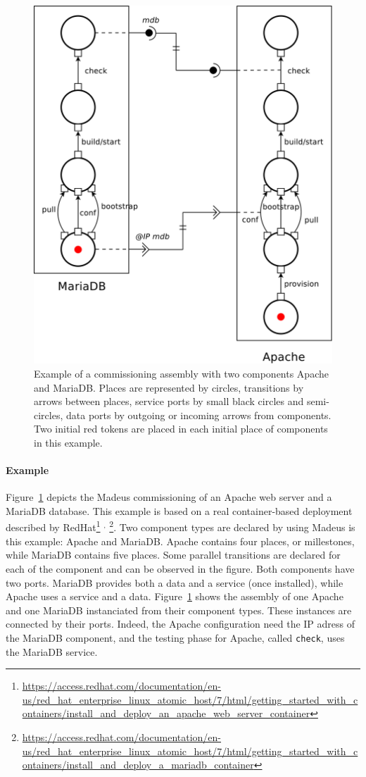 \begin{figure}[tbp]
  \begin{center}
    \includegraphics[width=0.7\linewidth]{./images/apachebdd.pdf}
  \end{center}
  \caption{Example of a commissioning assembly with two components
    Apache and MariaDB. Places are represented by circles, transitions
    by arrows between places, service ports by small black circles and
    semi-circles, data ports by outgoing or incoming arrows from
    components. Two initial red tokens are placed in each initial
    place of components in this example.}
  \label{fig:example}
\end{figure}

\paragraph{Example}{ Figure~\ref{fig:example} depicts the Madeus
  commissioning of an Apache web server and a MariaDB database. This
  example is based on a real container-based deployment described by
  RedHat\footnote{\url{https://access.redhat.com/documentation/en-us/red_hat_enterprise_linux_atomic_host/7/html/getting_started_with_containers/install_and_deploy_an_apache_web_server_container}}%
  $^,$%
  \footnote{\url{https://access.redhat.com/documentation/en-us/red_hat_enterprise_linux_atomic_host/7/html/getting_started_with_containers/install_and_deploy_a_mariadb_container}}. Two
  component types are declared by using Madeus is this example: Apache
  and MariaDB. Apache contains four places, or millestones, while
  MariaDB contains five places. Some parallel transitions are declared
  for each of the component and can be observed in the figure. Both
  components have two ports. MariaDB provides both a data and a
  service (once installed), while Apache uses a service and a
  data. Figure~\ref{fig:example} shows the assembly of one Apache and
  one MariaDB instanciated from their component types. These instances
  are connected by their ports. Indeed, the Apache configuration need
  the IP adress of the MariaDB component, and the testing phase for
  Apache, called \texttt{check}, uses the MariaDB service.}

